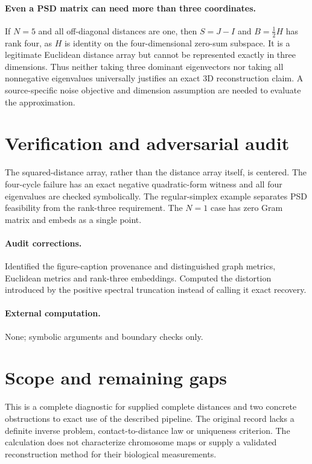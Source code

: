 \documentclass[11pt]{article}
\begin{document}
\paragraph{Even a PSD matrix can need more than three coordinates.}
If $N=5$ and all off-diagonal distances are one, then $S=J-I$ and
$B=\frac12H$ has rank four, as $H$ is identity on the four-dimensional
zero-sum subspace. It is a legitimate Euclidean distance array but cannot be
represented exactly in three dimensions. Thus neither taking three dominant
eigenvectors nor taking all nonnegative eigenvalues universally justifies an
exact 3D reconstruction claim. A source-specific noise objective and dimension
assumption are needed to evaluate the approximation.

\section{Verification and adversarial audit}

The squared-distance array, rather than the distance array itself, is centered.
The four-cycle failure has an exact negative quadratic-form witness and all
four eigenvalues are checked symbolically. The regular-simplex example separates
PSD feasibility from the rank-three requirement. The $N=1$ case has zero
Gram matrix and embeds as a single point.

\paragraph{Audit corrections.} Identified the figure-caption provenance and distinguished graph metrics,
Euclidean metrics and rank-three embeddings. Computed the distortion introduced
by the positive spectral truncation instead of calling it exact recovery.
\paragraph{External computation.} None; symbolic arguments and boundary checks only.
\section{Scope and remaining gaps}

This is a complete diagnostic for supplied complete distances and two concrete
obstructions to exact use of the described pipeline. The original record lacks
a definite inverse problem, contact-to-distance law or uniqueness criterion.
The calculation does not characterize chromosome maps or supply a validated
reconstruction method for their biological measurements.
\end{document}
